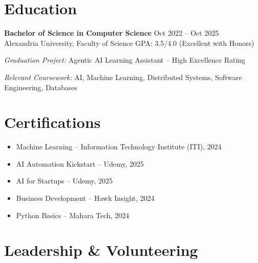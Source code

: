 \documentclass[11pt,a4paper]{article}
\begin{document}
\section*{Education}

\textbf{Bachelor of Science in Computer Science} \hfill Oct 2022 -- Oct 2025\\
Alexandria University, Faculty of Science \hfill GPA: 3.5/4.0 (Excellent with Honors)

\vspace{2pt}

\textit{Graduation Project:} Agentic AI Learning Assistant -- High Excellence Rating

\vspace{2pt}

\textit{Relevant Coursework:} AI, Machine Learning, Distributed Systems, Software Engineering, Databases

\section*{Certifications}

\begin{itemize}[leftmargin=0.5cm, itemsep=-2pt, parsep=2pt, topsep=0pt, label={-}]
    \item Machine Learning -- Information Technology Institute (ITI), 2024
    \item AI Automation Kickstart -- Udemy, 2025
    \item AI for Startups -- Udemy, 2025
    \item Business Development -- Hawk Insight, 2024
    \item Python Basics -- Mahara Tech, 2024
\end{itemize}

\section*{Leadership \& Volunteering}
\end{document}
